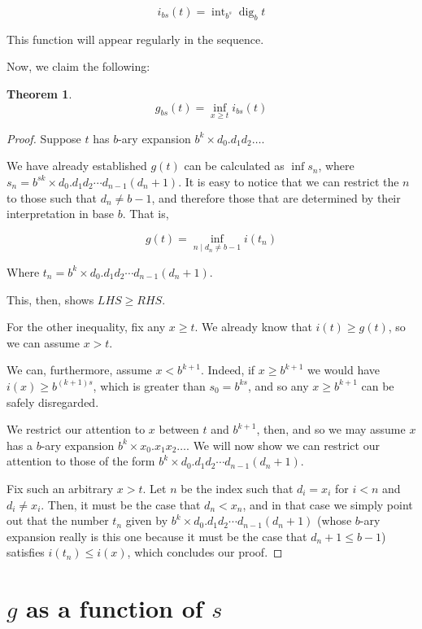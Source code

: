 \documentclass[11pt]{amsart}
\newtheorem{theorem}{Theorem}
\DeclareMathOperator{\dig}{dig}
\DeclareMathOperator{\intr}{int}
\begin{document}
\[ i_{bs}(t) = \intr_{b^s} \dig_b t \]

This function will appear regularly in the sequence.

Now, we claim the following:

\begin{theorem} \label{ginfi}
\[g_{bs}(t) = \inf_{x \geq t} i_{bs}(t)\]
\end{theorem}

\begin{proof}
Suppose $t$ has $b$-ary expansion $b^k \times d_0 . d_1 d_2 \dots$.

We have already established $g(t)$ can be calculated as $\inf s_n$, where $s_n = b^{sk} \times d_0 . d_1 d_2 \cdots d_{n-1} (d_n + 1)$. It is easy to notice that we can restrict the $n$ to those such that $d_n \neq b-1$, and therefore those that are determined by their interpretation in base $b$. That is,

\[g(t) = \inf_{n \mid d_n \neq b-1} i(t_n) \]

Where $t_n = b^k \times d_0 . d_1 d_2 \cdots d_{n-1} (d_n + 1)$.

This, then, shows $LHS \geq RHS$.

For the other inequality, fix any $x \geq t$. We already know that $i(t) \geq g(t)$, so we can assume $x > t$.

We can, furthermore, assume $x < b^{k+1}$. Indeed, if $x \geq b^{k+1}$ we would have $i(x) \geq b^{(k+1)s}$, which is greater than $s_0 = b^{ks}$, and so any $x \geq b^{k+1}$ can be safely disregarded.

We restrict our attention to $x$ between $t$ and $b^{k+1}$, then, and so we may assume $x$ has a $b$-ary expansion $b^k \times x_0 . x_1 x_2 \dots$. We will now show we can restrict our attention to those of the form $b^k \times d_0 . d_1 d_2 \cdots d_{n-1} (d_n + 1)$.

Fix such an arbitrary $x > t$. Let $n$ be the index such that $d_i = x_i$ for $i < n$ and $d_i \neq x_i$. Then, it must be the case that $d_n < x_n$, and in that case we simply point out that the number $t_n$ given by $b^k \times d_0 . d_1 d_2 \cdots d_{n-1} (d_n + 1)$ (whose $b$-ary expansion really is this one because it must be the case that $d_n + 1 \leq b-1$) satisfies $i(t_n) \leq i(x)$, which concludes our proof.
\end{proof}

\section{$g$ as a function of $s$}
\end{document}
